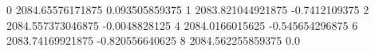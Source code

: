 0 2084.65576171875 0.093505859375
1 2083.821044921875 -0.7412109375
2 2084.557373046875 -0.0048828125
4 2084.0166015625 -0.545654296875
6 2083.74169921875 -0.820556640625
8 2084.562255859375 0.0
